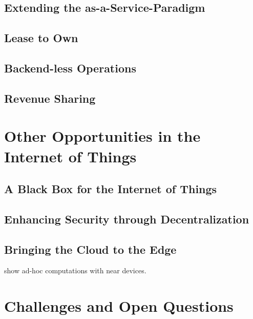 \subsection{Extending the as-a-Service-Paradigm}

\subsection{Lease to Own}

\subsection{Backend-less Operations}

\subsection{Revenue Sharing}

\section{Other Opportunities in the Internet of Things}

\subsection{A Black Box for the Internet of Things}

\subsection{Enhancing Security through Decentralization}

\subsection{Bringing the Cloud to the Edge}

\cite{Loke:2015:MCS:2737797.2656214} show ad-hoc computations with near devices.

\section{Challenges and Open Questions}

